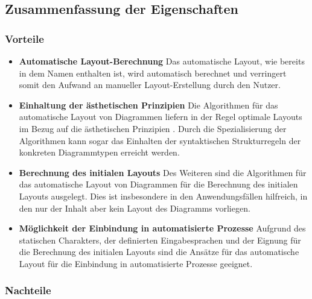 \subsection{Zusammenfassung der Eigenschaften}
\label{subsec:summary-automatic-layout}

\subsubsection{Vorteile}

\begin{itemize}

\item
\textbf{Automatische Layout-Berechnung}
Das automatische Layout, wie bereits in dem Namen enthalten ist, wird automatisch berechnet und verringert somit den Aufwand an manueller Layout-Erstellung durch den Nutzer. 

\item
\textbf{Einhaltung der ästhetischen Prinzipien}
Die Algorithmen für das automatische Layout von Diagrammen liefern in der Regel optimale Layouts im Bezug auf die ästhetischen Prinzipien \cite{Maier12A-Pattern-based}. Durch die Spezialisierung der Algorithmen kann sogar das Einhalten der syntaktischen Strukturregeln der konkreten Diagrammtypen erreicht werden.

\item
\textbf{Berechnung des initialen Layouts}
Des Weiteren sind die Algorithmen für das automatische Layout von Diagrammen für die Berechnung des initialen Layouts ausgelegt. Dies ist insbesondere in den Anwendungsfällen hilfreich, in den nur der Inhalt aber kein Layout des Diagramms vorliegen.

\item
\textbf{Möglichkeit der Einbindung in automatisierte Prozesse}
Aufgrund des statischen Charakters, der definierten Eingabesprachen und der Eignung für die Berechnung des initialen Layouts sind die Ansätze für das automatische Layout für die Einbindung in automatisierte Prozesse geeignet.

\end{itemize}

\subsubsection{Nachteile}

